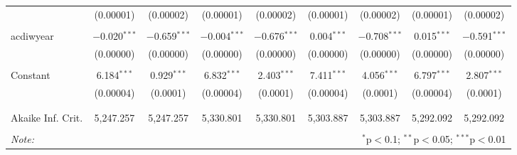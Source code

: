 \begin{table}[!htbp]
\begin{tabular}{@{\extracolsep{5pt}}lcccccccc}
  & (0.00001) & (0.00002) & (0.00001) & (0.00002) & (0.00001) & (0.00002) & (0.00001) & (0.00002) \\ 
  & & & & & & & & \\ 
 acdiwyear & $-$0.020$^{***}$ & $-$0.659$^{***}$ & $-$0.004$^{***}$ & $-$0.676$^{***}$ & 0.004$^{***}$ & $-$0.708$^{***}$ & 0.015$^{***}$ & $-$0.591$^{***}$ \\ 
  & (0.00000) & (0.00000) & (0.00000) & (0.00000) & (0.00000) & (0.00000) & (0.00000) & (0.00000) \\ 
  & & & & & & & & \\ 
 Constant & 6.184$^{***}$ & 0.929$^{***}$ & 6.832$^{***}$ & 2.403$^{***}$ & 7.411$^{***}$ & 4.056$^{***}$ & 6.797$^{***}$ & 2.807$^{***}$ \\ 
  & (0.00004) & (0.0001) & (0.00004) & (0.0001) & (0.00004) & (0.0001) & (0.00004) & (0.0001) \\ 
  & & & & & & & & \\ 
\hline \\[-1.8ex] 
Akaike Inf. Crit. & 5,247.257 & 5,247.257 & 5,330.801 & 5,330.801 & 5,303.887 & 5,303.887 & 5,292.092 & 5,292.092 \\ 
\hline 
\hline \\[-1.8ex] 
\textit{Note:}  & \multicolumn{8}{r}{$^{*}$p$<$0.1; $^{**}$p$<$0.05; $^{***}$p$<$0.01} \\ 
\end{tabular} 
\end{table} 
